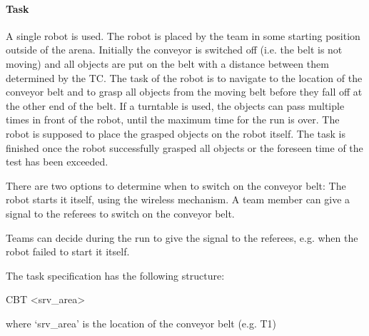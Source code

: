 
\paragraph{Task}
A single robot is used. The robot is placed by the team in some starting position outside of the arena. Initially the conveyor is switched off (i.e. the belt is not moving) and all objects are put on the belt with a distance between them determined by the TC. The task of the robot is to navigate to the location of the conveyor belt and to grasp all objects from the moving belt before they fall off at the other end of the belt. If a turntable is used, the objects can pass multiple times in front of the robot, until the maximum time for the run is over. The robot is supposed to place the grasped objects on the robot itself. The task is finished once the robot successfully grasped all objects or the foreseen time of the test has been exceeded. 
\par
There are two options to determine when to switch on the conveyor belt:
The robot starts it itself, using the wireless mechanism.
A team member can give a signal to the referees to switch on the conveyor belt.
\par
Teams can decide during the run to give the signal to the referees, e.g. when the robot failed to start it itself. 
\par
The task specification has the following structure:
\par
CBT \textless srv\_area\textgreater
\par
where ‘srv\_area’ is the location of the conveyor belt (e.g. T1)



%




